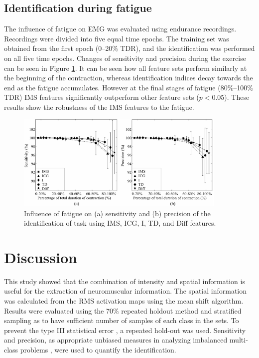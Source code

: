 \subsection{Identification during fatigue}
The influence of fatigue on EMG was evaluated using endurance recordings. Recordings were divided into five equal time epochs. The training set was obtained from the first epoch (0–20\% TDR), and the identification was performed on all five time epochs.
Changes of sensitivity and precision during the exercise can be seen in Figure \ref{fig:3-11}. It can be seen how all feature sets perform similarly at the beginning of the contraction, whereas identification indices decay towards the end as the fatigue accumulates. However at the final stages of fatigue (80\%–100\% TDR) IMS features significantly outperform other feature sets ($p < 0.05$). These results show the robustness of the IMS features to the fatigue.

\begin{figure}[ht]
\centering
\includegraphics[width=0.9\textwidth]{Images/figure3_11.png}
\caption{Influence of fatigue on (a) sensitivity and (b) precision of the identification of task using IMS, ICG, I, TD, and Diff features.}
\label{fig:3-11}
\end{figure}   
\clearpage

\section{Discussion} \label{sc:3-4}
This study showed that the combination of intensity and spatial information is useful for the extraction of neuromuscular information. The spatial information was calculated from the RMS activation maps using the mean shift algorithm. Results were evaluated using the 70\% repeated holdout method and stratified sampling as to have sufficient number of samples of each class in the sets. To prevent the type III statistical error \citep{Mosteller1948, Mohebian2017}, a repeated hold-out was used. Sensitivity and precision, as appropriate unbiased measures in analyzing imbalanced multi-class problems \citep{Jordanic2016b, Rojas-Martinez2013}, were used to quantify the identification.

